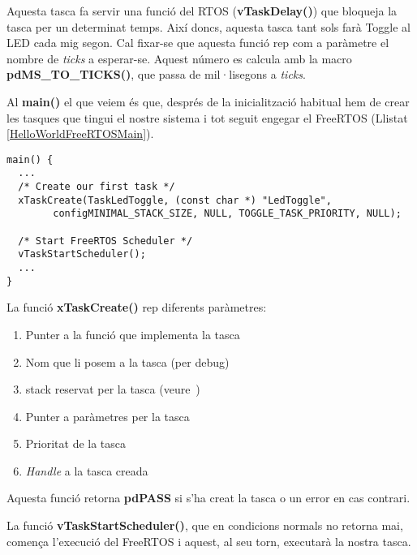 Aquesta tasca fa servir una funció del RTOS ({\bf vTaskDelay()}) que bloqueja la tasca per un determinat temps. Així doncs, aquesta tasca tant sols farà Toggle al LED cada mig segon. Cal fixar-se que aquesta funció rep com a paràmetre el nombre de {\em ticks} a esperar-se. Aquest número es calcula amb la macro {\bf pdMS\_TO\_TICKS()}, que passa de mil·lisegons a {\em ticks}.

Al {\bf main()} el que veiem és que, després de la inicialització habitual hem de crear les tasques que tingui el nostre sistema i tot seguit engegar el FreeRTOS (Llistat \ref{HelloWorldFreeRTOSMain}).

\begin{lstlisting}[caption={Main HelloWorld per FreeRTOS},style=customc,label=HelloWorldFreeRTOSMain]
main() {
  ...
  /* Create our first task */
  xTaskCreate(TaskLedToggle, (const char *) "LedToggle",
        configMINIMAL_STACK_SIZE, NULL, TOGGLE_TASK_PRIORITY, NULL);

  /* Start FreeRTOS Scheduler */
  vTaskStartScheduler();
  ...
}
\end{lstlisting}

La funció {\bf xTaskCreate()} rep diferents paràmetres:
\begin{enumerate}
 \item Punter a la funció que implementa la tasca
 \item Nom que li posem a la tasca (per debug)
 \item \gls{stack} reservat per la tasca (veure~)
 \item Punter a paràmetres per la tasca
 \item Prioritat de la tasca
 \item {\em Handle} a la tasca creada
\end{enumerate}

Aquesta funció retorna {\bf pdPASS} si s'ha creat la tasca o un error en cas contrari.

La funció {\bf vTaskStartScheduler()}, que en condicions normals no retorna mai, comença l'execució del FreeRTOS i aquest, al seu torn, executarà la nostra tasca.





